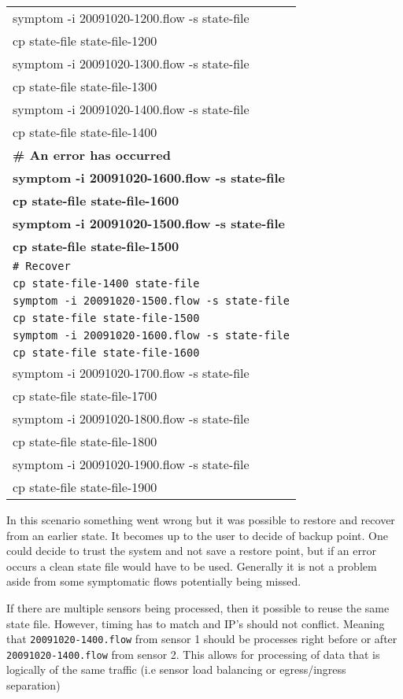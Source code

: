 \documentclass[titlepage,12pt]{report}
\begin{document}
\begin{center}
\begin{tabular}{l}
symptom -i 20091020-1200.flow -s state-file \\
cp state-file state-file-1200 \\
symptom -i 20091020-1300.flow -s state-file  \\
cp state-file state-file-1300 \\
symptom -i 20091020-1400.flow -s state-file  \\
cp state-file state-file-1400 \\
\textbf{\# An error has occurred} \\
\textbf{symptom -i 20091020-1600.flow -s state-file}  \\
\textbf{cp state-file state-file-1600} \\
\textbf{symptom -i 20091020-1500.flow -s state-file}  \\
\textbf{cp state-file state-file-1500} \\
\texttt{\# Recover} \\
\texttt{cp state-file-1400 state-file} \\
\texttt{symptom -i 20091020-1500.flow -s state-file}\\
\texttt{cp state-file state-file-1500}\\
\texttt{symptom -i 20091020-1600.flow -s state-file}\\
\texttt{cp state-file state-file-1600}\\
symptom -i 20091020-1700.flow -s state-file  \\
cp state-file state-file-1700 \\
symptom -i 20091020-1800.flow -s state-file  \\
cp state-file state-file-1800 \\
symptom -i 20091020-1900.flow -s state-file  \\
cp state-file state-file-1900
\end{tabular}
\end{center}

In this scenario something went wrong but it was possible to restore and recover from an earlier state. It becomes up to the user to decide of backup point. One could decide to trust the system and not save a restore point, but if an error occurs a clean state file would have to be used. Generally it is not a problem aside from some symptomatic flows potentially being missed.

If there are multiple sensors being processed, then it possible to reuse the same state file. However, timing has to match and IP's should not conflict. Meaning that \texttt{20091020-1400.flow} from sensor 1 should be processes right before or after \texttt{20091020-1400.flow} from sensor 2. This allows for processing of data that is logically of the same traffic (i.e sensor load balancing or egress/ingress separation)
\end{document}
